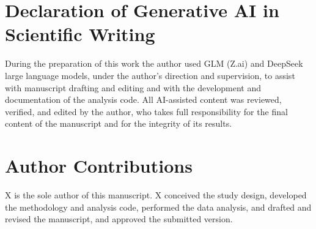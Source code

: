 \documentclass[11pt,a4paper]{article}
\theoremstyle{plain}
\theoremstyle{definition}
\theoremstyle{remark}
\begin{document}
\section*{Declaration of Generative AI in Scientific Writing}
During the preparation of this work the author used GLM (Z.ai) and
DeepSeek large language models, under the author's direction and
supervision, to assist with manuscript drafting and editing and with
the development and documentation of the analysis code. All
AI-assisted content was reviewed, verified, and edited by the
author, who takes full responsibility for the final content of the
manuscript and for the integrity of its results.

\section*{Author Contributions}
X is the sole author of this manuscript. X conceived the study
design, developed the methodology and analysis code, performed the
data analysis, and drafted and revised the manuscript, and approved
the submitted version.


\end{document}
